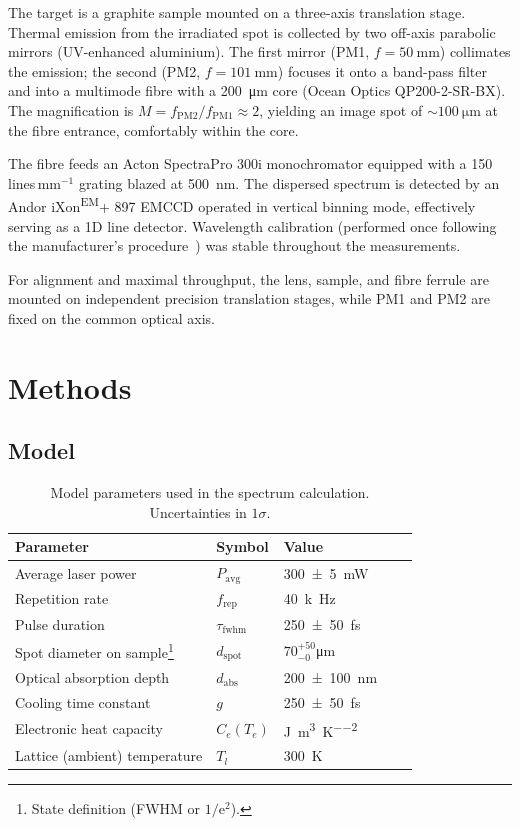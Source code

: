 \documentclass[
	parskip=half,
	a4paper,
]{scrarticle}
\begin{document}
The target is a graphite sample mounted on a three-axis translation stage. Thermal emission from the irradiated spot is collected by two off-axis parabolic mirrors (UV-enhanced aluminium). The first mirror (PM1, \(f=\SI{50}{\milli\metre}\)) collimates the emission; the second (PM2, \(f=\SI{101}{\milli\metre}\)) focuses it onto a band-pass filter and into a multimode fibre with a \SI{200}{\micro\metre} core (Ocean Optics QP200-2-SR-BX). The magnification is \(M = f_{\mathrm{PM2}}/f_{\mathrm{PM1}} \approx 2\), yielding an image spot of \(\sim\SI{100}{\micro\metre}\) at the fibre entrance, comfortably within the core.

The fibre feeds an Acton SpectraPro 300i monochromator equipped with a 150\,lines\,mm\(^{-1}\) grating blazed at \SI{500}{\nano\metre}. The dispersed spectrum is detected by an Andor iXon\textsuperscript{EM}+ 897 EMCCD operated in vertical binning mode, effectively serving as a 1D line detector.
Wavelength calibration (performed once following the manufacturer’s procedure~\cite{roob_thermal_2025}) was stable throughout the measurements.

For alignment and maximal throughput, the lens, sample, and fibre ferrule are mounted on independent precision translation stages, while PM1 and PM2 are fixed on the common optical axis. 

\section{Methods}

\subsection{Model}
\begin{table}
    \centering
    \begin{tabular}{lllll}
        Parameter & Symbol & Value & \\
        \hline
        Average laser power & $P_{\text{avg}}$ & \SI{300(5)}{mW} &  &  \\
        Repetition rate & $f_{\text{rep}}$ & \SI{40}{k\hertz} &  &  \\
        Pulse duration & $\tau_\text{fwhm}$ & \SI{250(50)}{fs}& \\
        Spot diameter on sample\footnote{State definition (FWHM or $1/\mathrm e^2$).} & $d_{\text{spot}}$ & $70^{+50}_{-0}$\;\si{\micro\metre}\\
        Optical absorption depth & $d_{\text{abs}}$ & \SI{200(100)}{\nano\metre} & \cite{smausz_determination_2017} &  \\
        Cooling time constant & $g$ & \SI{250(50)}{fs} & \cite{stange_hot_2015} &  \\
        Electronic heat capacity & $C_e(T_e)$ & \si{\joule\per\metre\cubed\per\kelvin\squared} & \cite{nihira_temperature_2003} &  \\
        Lattice (ambient) temperature & $T_l$ & \SI{300}{\kelvin} & &  \\
    \end{tabular}
    \caption{Model parameters used in the spectrum calculation. Uncertainties in $1\sigma$.}
    \label{tab:parameters}
\end{table}
\end{document}
